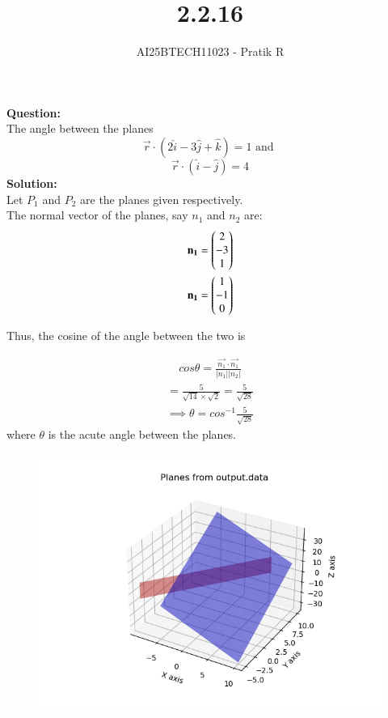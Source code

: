 \documentclass[journal]{IEEEtran}
\begin{document}

\vspace{3cm}

\title{2.2.16}
\author{AI25BTECH11023 - Pratik R
}
{\let\newpage\relax\maketitle}

\renewcommand{\thefigure}{\theenumi}
\renewcommand{\thetable}{\theenumi}
\setlength{\intextsep}{10pt} %


\renewcommand{\thetable}{\theenumi}


\textbf{Question: }\\
The angle between the planes
$$
\vec r \cdot (2\hat{i}-3\hat{j}+\hat{k})=1 \text{ and } 
$$
$$
\vec r \cdot(\hat{i}-\hat{j})=4
$$
\textbf{Solution: } \\
Let $P_1$ and $P_2$ are the planes given respectively. \\
The normal vector of the planes, say $n_1$ and $n_2$ are:
\begin{align}
    \mathbf {n_1}= \begin{pmatrix}2 \\ -3 \\ 1\end{pmatrix} \\
    \mathbf {n_1}= \begin{pmatrix}1 \\ -1 \\ 0\end{pmatrix}
\end{align}

Thus, the cosine of the angle between the two is


\begin{align}
   cos\theta = \frac{\vec {n_1} \cdot \vec {n_1}}{|n_1||n_2|}  
\end{align}
\begin{align}
    = \frac{5}{\sqrt{14}\times\sqrt{2}} = \frac{5}{\sqrt{28}}
\end{align}
\begin{align}
    \implies \theta = cos^{-1}\frac{5}{\sqrt{28}}
\end{align}
where $\theta$ is the acute angle between the planes.

\begin{figure}[h!]
    \centering
    \includegraphics[width=0.7\columnwidth]{figs/fig.png}
    \caption{}
\end{figure}
\end{document}
